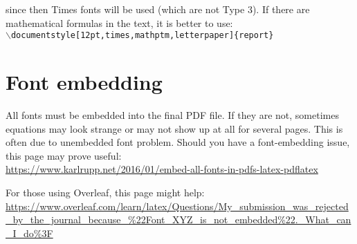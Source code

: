 \noindent
since then Times fonts will be used (which are not Type 3). If there are mathematical formulas in the text, it is better to use:\\
%
{\tt $\backslash$documentstyle[12pt,times,mathptm,letterpaper]\{report\}}


\section{Font embedding}

All fonts must be embedded into the final PDF file. If they are not, sometimes equations may look strange or may not show up at all for several pages. This is often due to unembedded font problem. Should you have a font-embedding issue, this page may prove useful:\\
%
\url{https://www.karlrupp.net/2016/01/embed-all-fonts-in-pdfs-latex-pdflatex}

For those using Overleaf, this page might help:
\url{https://www.overleaf.com/learn/latex/Questions/My_submission_was_rejected_by_the_journal_because_%22Font_XYZ_is_not_embedded%22._What_can_I_do%3F}
